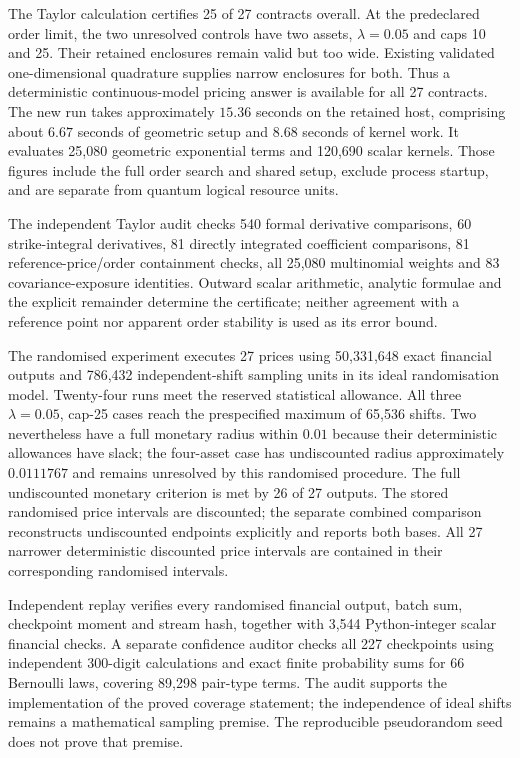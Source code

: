 The Taylor calculation certifies 25 of 27 contracts overall. At the
predeclared order limit, the two unresolved controls have two assets,
$\lambda=0.05$ and caps 10 and 25. Their retained enclosures remain valid
but too wide. Existing validated one-dimensional quadrature supplies narrow
enclosures for both. Thus a deterministic continuous-model pricing answer
is available for all 27 contracts. The new run takes approximately
$15.36$ seconds on the retained host, comprising about $6.67$ seconds of
geometric setup and $8.68$ seconds of kernel work. It evaluates 25,080
geometric exponential terms and 120,690 scalar kernels. Those figures include
the full order search and shared setup, exclude process startup, and are
separate from quantum logical resource units.

The independent Taylor audit checks 540 formal derivative comparisons,
60 strike-integral derivatives, 81 directly integrated coefficient
comparisons, 81 reference-price/order containment checks, all 25,080
multinomial weights and 83 covariance-exposure identities. Outward scalar
arithmetic, analytic formulae and the explicit remainder determine the
certificate; neither agreement with a reference point nor apparent order
stability is used as its error bound.

The randomised experiment executes 27 prices using 50,331,648 exact
financial outputs and 786,432 independent-shift sampling units in its ideal
randomisation model. Twenty-four runs meet the reserved statistical
allowance. All three $\lambda=0.05$, cap-25 cases reach the prespecified
maximum of 65,536 shifts. Two nevertheless have a full monetary radius
within $0.01$ because their deterministic allowances have slack; the
four-asset case has undiscounted radius approximately $0.0111767$ and
remains unresolved by this randomised procedure. The full undiscounted
monetary criterion is met by 26 of 27 outputs. The stored randomised price
intervals are discounted; the separate combined comparison reconstructs
undiscounted endpoints explicitly and reports both bases.
All 27 narrower deterministic discounted price intervals are contained in
their corresponding randomised intervals.

Independent replay verifies every randomised financial output, batch sum,
checkpoint moment and stream hash, together with 3,544 Python-integer scalar
financial checks. A separate confidence auditor checks all 227 checkpoints
using independent 300-digit calculations and exact finite probability
sums for 66 Bernoulli laws, covering 89,298 pair-type terms. The audit
supports the implementation of the proved coverage statement; the independence
of ideal shifts remains a mathematical sampling premise. The reproducible
pseudorandom seed does not prove that premise.

